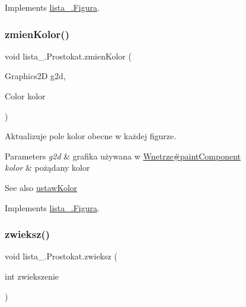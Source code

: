 Implements \mbox{\hyperlink{interfacelista__5_1_1_figura_a9d60d64b495755a3e48a3eee549a728d}{lista\+\_.\+Figura}}.

\mbox{\label{classlista__5_1_1_prostokat_aa776fbd55cc88f2bb8b8a202109e77ce}} 
\subsubsection{\texorpdfstring{zmien\+Kolor()}{zmienKolor()}}
{\footnotesize\ttfamily void lista\+\_.\+Prostokat.\+zmien\+Kolor (\begin{DoxyParamCaption}\item[{Graphics2D}]{g2d,  }\item[{Color}]{kolor }\end{DoxyParamCaption})}

Aktualizuje pole kolor obecne w każdej figurze. 
\begin{DoxyParams}{Parameters}
{\em g2d} & grafika używana w \mbox{\hyperlink{classlista__5_1_1_wnetrze_aa8676192e150a17230d72de122744a47}{Wnetrze\#paint\+Component}} \\
\hline
{\em kolor} & pożądany kolor \\
\hline
\end{DoxyParams}
\begin{DoxySeeAlso}{See also}
\mbox{\hyperlink{interfacelista__5_1_1_figura_a3cc13bf7229b288d743be7903b3b61a4}{ustaw\+Kolor}}
\end{DoxySeeAlso}
 

Implements \mbox{\hyperlink{interfacelista__5_1_1_figura_aeb0982dc44348dd1fde9266d9d476ed0}{lista\+\_.\+Figura}}.

\mbox{\label{classlista__5_1_1_prostokat_acc961816d5fba86f3442ca34059492f5}} 
\subsubsection{\texorpdfstring{zwieksz()}{zwieksz()}}
{\footnotesize\ttfamily void lista\+\_.\+Prostokat.\+zwieksz (\begin{DoxyParamCaption}\item[{int}]{zwiekszenie }\end{DoxyParamCaption})}

